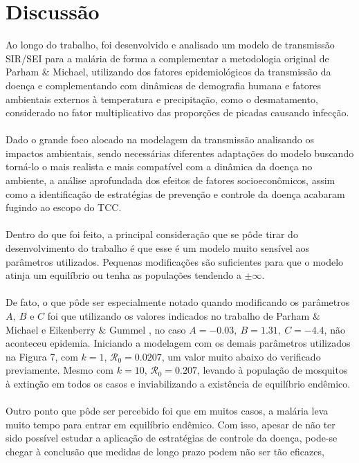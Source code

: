 \chapter{Discussão}

Ao longo do trabalho, foi desenvolvido e analisado um modelo de transmissão 
SIR/SEI para a malária de forma a complementar a metodologia original de Parham \& Michael, 
utilizando dos fatores epidemiológicos da transmissão da doença e complementando com 
dinâmicas de demografia humana e fatores ambientais externos à temperatura e precipitação,
como o desmatamento, considerado no fator multiplicativo das proporções de picadas
causando infecção. 
\\\\
Dado o grande foco alocado na modelagem da transmissão analisando os impactos 
ambientais, sendo necessárias diferentes adaptações do modelo buscando torná-lo o 
mais realista e mais compatível com a dinâmica da doença no ambiente, a análise 
aprofundada dos efeitos de fatores socioeconômicos, assim como a identificação 
de estratégias de prevenção e controle da doença acabaram fugindo ao escopo do 
TCC.
\\\\
Dentro do que foi feito, a principal consideração que se pôde tirar do 
desenvolvimento do trabalho é que esse é um modelo muito sensível aos 
parâmetros utilizados. Pequenas modificações são suficientes para que o modelo 
atinja um equilíbrio ou tenha as populações tendendo a $\pm \infty$.
\\\\
De fato, o que pôde ser especialmente notado quando modificando os parâmetros 
$A, \ B$ e $C$ foi que utilizando os valores indicados
no trabalho de Parham $\&$ Michael \cite{Parham2010} e Eikenberry $\&$ Gummel \cite{OKUNEYE201772},
no caso $A = -0.03, \ B = 1.31, \ C = -4.4$, não aconteceu epidemia.
Iniciando a modelagem com os demais parâmetros utilizados 
na Figura 7, com $k=1$, $\mathcal{R}_0 = 0.0207$, um valor muito abaixo do verificado previamente.
Mesmo com $k=10$, $\mathcal{R}_0 = 0.207$, levando à população de mosquitos à extinção em todos os casos 
e inviabilizando a existência de equilíbrio endêmico.
\\\\
Outro ponto que pôde ser percebido foi que em muitos casos, 
a malária leva muito tempo para entrar em equilíbrio endêmico. Com isso,
apesar de não ter sido possível estudar a aplicação de estratégias de controle da doença,
pode-se chegar à conclusão que medidas de longo prazo podem não ser tão eficazes,
